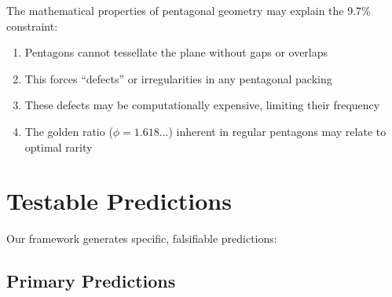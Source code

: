 \documentclass[pmlr,onecolumn]{jmlr}
\begin{document}
The mathematical properties of pentagonal geometry may explain the 9.7\% constraint:

\begin{enumerate}
\item Pentagons cannot tessellate the plane without gaps or overlaps
\item This forces ``defects'' or irregularities in any pentagonal packing
\item These defects may be computationally expensive, limiting their frequency
\item The golden ratio ($\phi = 1.618...$) inherent in regular pentagons may relate to optimal rarity
\end{enumerate}

\section{Testable Predictions}

Our framework generates specific, falsifiable predictions:

\subsection{Primary Predictions}
\end{document}
